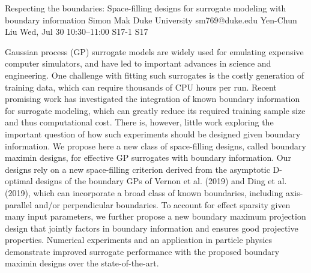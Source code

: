 \documentclass[12pt,lettersize,oneside]{book} %
\begin{document}
\begin{talk}
  {Respecting the boundaries: Space-filling designs for surrogate modeling with boundary information}%
  {Simon Mak}%
  {Duke University}%
  {sm769@duke.edu}%
  {Yen-Chun Liu}%
  {}%
  {Wed, Jul 30 10:30--11:00}%
  {S17-1}%
  {S17}%
  
    
   
Gaussian process (GP) surrogate models are widely used for emulating expensive computer simulators, and have led to important advances in science and engineering. One challenge with fitting such surrogates is the costly generation of training data, which can require thousands of CPU hours per run. Recent promising work has investigated the integration of known boundary information for surrogate modeling, which can greatly reduce its required training sample size and thus computational cost. There is, however, little work exploring the important question of how such experiments should be designed given boundary information. We propose here a new class of space-filling designs, called boundary maximin designs, for effective GP surrogates with boundary information. Our designs rely on a new space-filling criterion derived from the asymptotic D-optimal designs of the boundary GPs of Vernon et al. (2019) and Ding et al. (2019), which can incorporate a broad class of known boundaries, including axis-parallel and/or perpendicular boundaries. To account for effect sparsity given many input parameters, we further propose a new boundary maximum projection design that jointly factors in boundary information and ensures good projective properties. Numerical experiments and an application in particle physics demonstrate improved surrogate performance with the proposed boundary maximin designs over the state-of-the-art.
\medskip


\end{talk}
\end{document}
